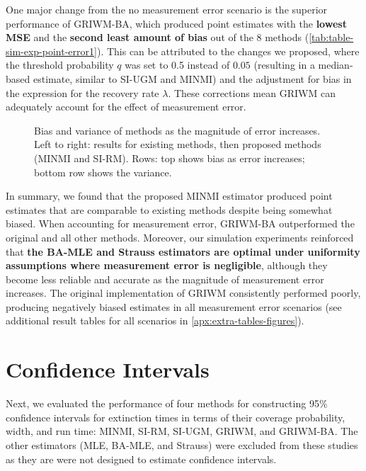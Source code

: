 One major change from the no measurement error scenario is the superior performance of GRIWM-BA, which produced point estimates with the \textbf{lowest MSE} and the \textbf{second least amount of bias} out of the 8 methods (\autoref{tab:table-sim-exp-point-error1}). This can be attributed to the changes we proposed, where the threshold probability $q$ was set to 0.5 instead of $0.05$ (resulting in a median-based estimate, similar to SI-UGM and MINMI) and the adjustment for bias in the expression for the recovery rate $\lambda$. These corrections mean GRIWM can adequately account for the effect of measurement error.

\begin{figure}[ht]
    \centering
    
    \caption{Bias and variance of methods as the magnitude of error increases. Left to right: results for existing methods, then proposed methods (MINMI and SI-RM). Rows: top shows bias as error increases; bottom row shows the variance.}
    \label{fig:sim-exp-bias-variance}
\end{figure}

In summary, we found that the proposed MINMI estimator produced point estimates that are comparable to existing methods despite being somewhat biased. When accounting for measurement error, GRIWM-BA outperformed the original and all other methods. Moreover, our simulation experiments reinforced that \textbf{the BA-MLE and Strauss estimators are optimal under uniformity assumptions where measurement error is negligible}, although they become less reliable and accurate as the magnitude of measurement error increases. The original implementation of GRIWM consistently performed poorly, producing negatively biased estimates in all measurement error scenarios (see additional result tables for all scenarios in \autoref{apx:extra-tables-figures}).

\section{Confidence Intervals}

Next, we evaluated the performance of four methods for constructing 95\% confidence intervals for extinction times in terms of their coverage probability, width, and run time: MINMI, SI-RM, SI-UGM, GRIWM, and GRIWM-BA. The other estimators (MLE, BA-MLE, and Strauss) were excluded from these studies as they are were not designed to estimate confidence intervals.

